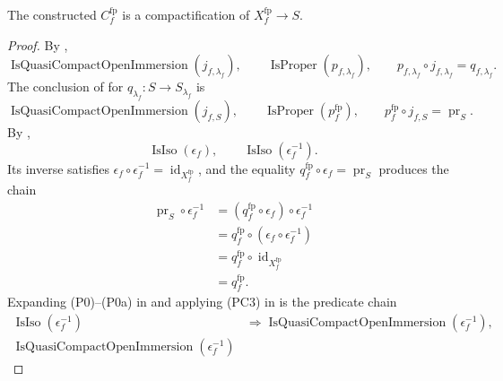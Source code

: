 \begin{lemma}
  \label{lemma:nagata-final-basechanged-compactification}
  \lean{}
\checked
  The constructed $C_f^{\mathrm{fp}}$ is a compactification of
  $X_f^{\mathrm{fp}}\to S$.
\end{lemma}

\begin{proof}
\checked
  By ,
  \[
    \operatorname{IsQuasiCompactOpenImmersion}(j_{f,\lambda_f}),
    \qquad
    \operatorname{IsProper}(p_{f,\lambda_f}),
    \qquad
    p_{f,\lambda_f}\circ j_{f,\lambda_f}=q_{f,\lambda_f}.
  \]
  The conclusion of  for
  $q_{\lambda_f}\colon S\to S_{\lambda_f}$ is
  \[
    \operatorname{IsQuasiCompactOpenImmersion}(j_{f,S}),
    \qquad
    \operatorname{IsProper}(p_f^{\mathrm{fp}}),
    \qquad
    p_f^{\mathrm{fp}}\circ j_{f,S}=\operatorname{pr}_S.
  \]
  By ,
  \[
    \operatorname{IsIso}(\epsilon_f),
    \qquad
    \operatorname{IsIso}(\epsilon_f^{-1}).
  \]
  Its inverse satisfies
  $\epsilon_f\circ\epsilon_f^{-1}
    =\operatorname{id}_{X_f^{\mathrm{fp}}}$, and the equality
  $q_f^{\mathrm{fp}}\circ\epsilon_f=\operatorname{pr}_S$ produces the chain
  \[
  \begin{aligned}
    \operatorname{pr}_S\circ\epsilon_f^{-1}
      &=(q_f^{\mathrm{fp}}\circ\epsilon_f)
        \circ\epsilon_f^{-1}\\
      &=q_f^{\mathrm{fp}}\circ
        (\epsilon_f\circ\epsilon_f^{-1})\\
      &=q_f^{\mathrm{fp}}\circ
        \operatorname{id}_{X_f^{\mathrm{fp}}}\\
      &=q_f^{\mathrm{fp}}.
  \end{aligned}
  \]
  Expanding (P0)--(P0a) in
   and applying (PC3) in
   is the predicate chain
  \[
  \begin{aligned}
    \operatorname{IsIso}(\epsilon_f^{-1})
      &\Longrightarrow
        \operatorname{IsQuasiCompactOpenImmersion}(\epsilon_f^{-1}),\\
    \operatorname{IsQuasiCompactOpenImmersion}(\epsilon_f^{-1})

\end{aligned}\]
\end{proof}
